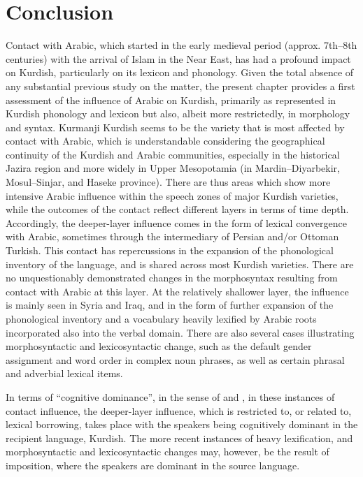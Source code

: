 \documentclass[output=paper]{langsci/langscibook}
\begin{document}
\section{Conclusion}
Contact with Arabic, which started in the early medieval period (approx. 7th–8th centuries) with the arrival of Islam in the Near East, has had a profound impact on Kurdish, particularly on its lexicon and phonology. Given the total absence of any substantial previous study on the matter, the present chapter provides a first assessment of the influence of Arabic on Kurdish, primarily as represented in Kurdish phonology and lexicon but also, albeit more restrictedly, in morphology and syntax. Kurmanji Kurdish seems to be the variety that is most affected by contact with Arabic, which is understandable considering the geographical continuity of the Kurdish and Arabic communities, especially in the historical Jazira region and more widely in Upper Mesopotamia (in Mardin–Diyarbekir, Mosul–Sinjar, and Haseke province). There are thus areas which show more intensive Arabic influence within the speech zones of major Kurdish varieties, while the outcomes of the contact reflect different layers in terms of time depth. Accordingly, the deeper-layer influence comes in the form of lexical convergence with Arabic, sometimes through the intermediary of Persian and/or Ottoman Turkish. This contact has repercussions in the expansion of the phonological inventory of the language, and is shared across most Kurdish varieties. There are no unquestionably demonstrated changes in the morphosyntax resulting from contact with Arabic at this layer. At the relatively shallower layer, the influence is mainly seen in Syria and Iraq, and in the form of further expansion of the phonological inventory and a vocabulary heavily lexified by Arabic roots incorporated also into the verbal domain. There are also several cases illustrating morphosyntactic and lexicosyntactic change, such as the default gender assignment and word order in complex noun phrases, as well as certain phrasal and adverbial lexical items. 

In terms of “cognitive dominance”, in the sense of \citet{VanCoetsem1988,VanCoetsem2000} and \citet{Lucas2015}, in these instances of contact influence, the deeper-layer influence, which is restricted to, or related to, lexical borrowing, takes place with the speakers being cognitively dominant in the recipient language, Kurdish. The more recent instances of heavy lexification, and morphosyntactic and lexicosyntactic changes may, however, be the result of imposition, where the speakers are dominant in the source language. 
\end{document}
